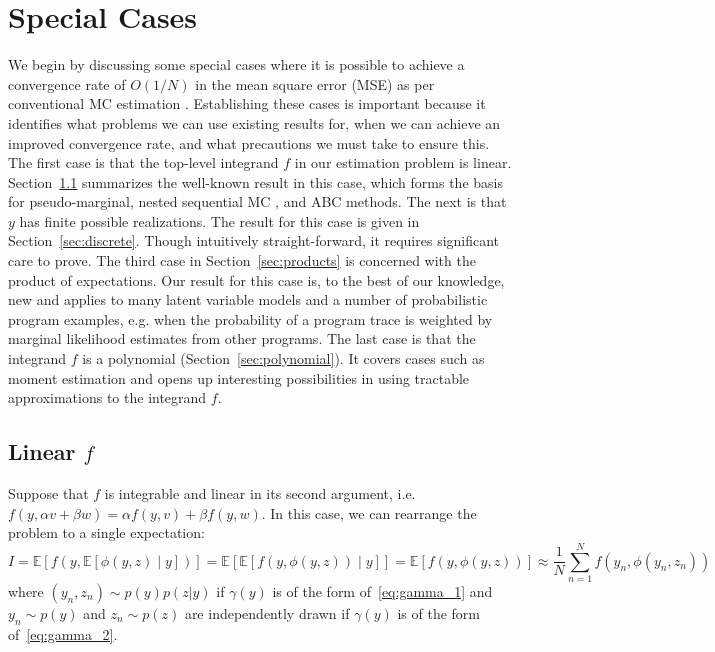 
\section{Special Cases}
\label{sec:special_cases}

We begin by discussing some special cases where it is possible to achieve a
convergence rate of $O(1/N)$ in the mean square error (MSE) as per conventional
MC estimation \citep{robert2004monte}.  
Establishing these cases is important because it identifies what problems we can use existing results for,
when we can achieve an improved convergence rate, and what precautions we must take to ensure this.
The first case is that the top-level integrand $f$ in our estimation problem is linear. 
Section~\ref{sec:linear_case} summarizes the well-known result in this case, which forms the basis for pseudo-marginal, 
nested sequential MC \citep{andersson2015nested}, and ABC methods. The next is that $y$ has finite possible realizations.
The result for this case is given in Section~\ref{sec:discrete}. Though intuitively straight-forward, it 
requires significant care to prove. The third case in Section~\ref{sec:products} is concerned with the product of expectations.
Our result for this case is, to the best of our knowledge, new and applies to many latent variable models and a number 
of probabilistic program examples, e.g. when the probability of a program trace
is weighted by marginal likelihood estimates from other programs.
The last case is that the integrand $f$ is a polynomial (Section~\ref{sec:polynomial}). It 
covers cases such as moment estimation and opens up interesting possibilities in using tractable 
approximations to the integrand $f$.

\subsection{Linear $f$}
\label{sec:linear_case}

Suppose that $f$ 
is integrable and linear in its second argument, i.e. $f(y,\alpha v + \beta w) = 
\alpha f(y,v)+ \beta f(y,w)$.
In this case, we can rearrange the problem to a single expectation:
\[
I
 = \mathbb{E}\left[f\left(y,\mathbb{E}\left[\phi(y,z)\middle|y\right]\right)\right]
= \mathbb{E}\left[ \mathbb{E}\left[f(y,\phi(y,z))\middle|y\right]\right] = \mathbb{E}\left[f(y,\phi(y,z))\right]
 \approx\frac{1}{N} \sum_{n=1}^{N} f(y_n,\phi(y_n,z_n))
\]
where $(y_n, z_n) \sim p(y)p(z|y)$ if $\gamma(y)$ is of the form of~\eqref{eq:gamma_1} and
$y_n \sim p(y)$ and $z_n \sim p(z)$ are independently drawn if $\gamma(y)$ is of the form of~\eqref{eq:gamma_2}.

